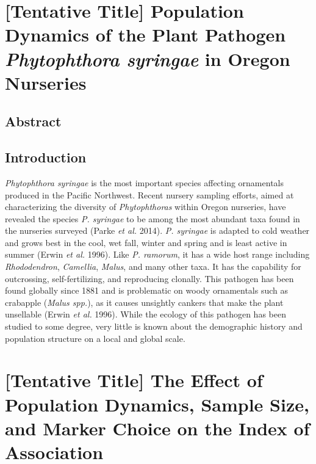\documentclass[double,12pt]{beavtex}
\begin{document}
  \chapter{\texorpdfstring{{[}Tentative Title{]} Population Dynamics of
  the Plant Pathogen \emph{Phytophthora syringae} in Oregon
  Nurseries}{{[}Tentative Title{]} Population Dynamics of the Plant Pathogen Phytophthora syringae in Oregon Nurseries}}\label{tentative-title-population-dynamics-of-the-plant-pathogen-phytophthora-syringae-in-oregon-nurseries}
  
  \section{Abstract}\label{abstract-3}
  
  \section{Introduction}\label{introduction-1}
  
  \emph{Phytophthora syringae} is the most important species affecting
  ornamentals produced in the Pacific Northwest. Recent nursery sampling
  efforts, aimed at characterizing the diversity of \emph{Phytophthoras}
  within Oregon nurseries, have revealed the species \emph{P. syringae} to
  be among the most abundant taxa found in the nurseries surveyed (Parke
  \emph{et al.} 2014). \emph{P. syringae} is adapted to cold weather and
  grows best in the cool, wet fall, winter and spring and is least active
  in summer (Erwin \emph{et al.} 1996). Like \emph{P. ramorum}, it has a
  wide host range including \emph{Rhododendron}, \emph{Camellia},
  \emph{Malus}, and many other taxa. It has the capability for
  outcrossing, self-fertilizing, and reproducing clonally. This pathogen
  has been found globally since 1881 and is problematic on woody
  ornamentals such as crabapple (\emph{Malus spp.}), as it causes
  unsightly cankers that make the plant unsellable (Erwin \emph{et al.}
  1996). While the ecology of this pathogen has been studied to some
  degree, very little is known about the demographic history and
  population structure on a local and global scale.
  
  \chapter{{[}Tentative Title{]} The Effect of Population Dynamics, Sample
  Size, and Marker Choice on the Index of
  Association}\label{tentative-title-the-effect-of-population-dynamics-sample-size-and-marker-choice-on-the-index-of-association}
  
\end{document}
